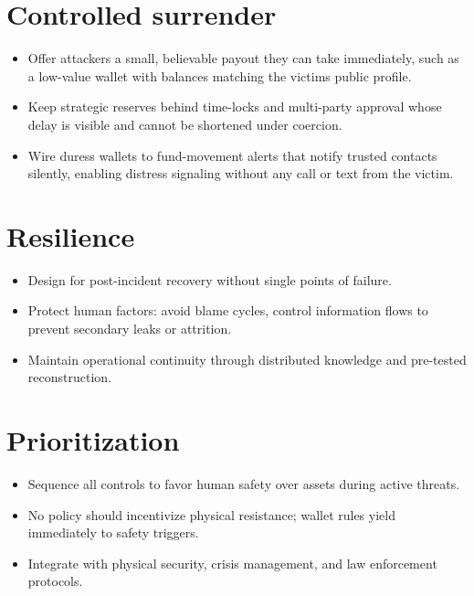 \section{Controlled surrender}\label{controlled-surrender}

\begin{itemize}
\tightlist
\item
  Offer attackers a small, believable payout they can take immediately, such as a low-value wallet with balances matching the victim\textquotesingle s public profile.
\item
  Keep strategic reserves behind time-locks and multi-party approval whose delay is visible and cannot be shortened under coercion.
\item
  Wire duress wallets to fund-movement alerts that notify trusted contacts silently, enabling distress signaling without any call or text from the victim.
\end{itemize}

\section{Resilience}\label{resilience}

\begin{itemize}
\tightlist
\item
  Design for post-incident recovery without single points of failure.
\item
  Protect human factors: avoid blame cycles, control information flows to prevent secondary leaks or attrition.
\item
  Maintain operational continuity through distributed knowledge and pre-tested reconstruction.
\end{itemize}

\section{Prioritization}\label{prioritization}

\begin{itemize}
\tightlist
\item
  Sequence all controls to favor human safety over assets during active threats.
\item
  No policy should incentivize physical resistance; wallet rules yield immediately to safety triggers.
\item
  Integrate with physical security, crisis management, and law enforcement protocols.
\end{itemize}

